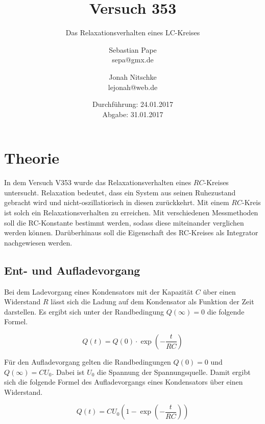 

\title{Versuch 353}
\subtitle{Das Relaxationsverhalten eines LC-Kreises}
\author{Sebastian Pape\\
        sepa@gmx.de \and
        Jonah Nitschke\\
        lejonah@web.de}
\date{Durchführung: 24.01.2017\\
      Abgabe: 31.01.2017}


\maketitle
\setcounter{page}{1}

\section{Theorie}

In dem Versuch V353 wurde das Relaxationsverhalten eines $RC$-Kreises untersucht.
Relaxation bedeutet, dass ein System aus seinen Ruhezustand gebracht wird
und nicht-oszillatiorisch in diesen zurückkehrt.
Mit einem $RC$-Kreis ist solch ein Relaxationsverhalten zu erreichen. Mit verschiedenen
Messmethoden soll die RC-Konstante bestimmt werden, sodass diese miteinander
verglichen werden können. Darüberhinaus soll die Eigenschaft des RC-Kreises als
Integrator nachgewiesen werden.

\subsection{Ent- und Aufladevorgang}

Bei dem Ladevorgang eines Kondensators mit der Kapazität $C$ über einen Widerstand
$R$ lässt sich die Ladung auf dem Kondensator als Funktion der Zeit darstellen.
Es ergibt sich unter der Randbedingung $Q(\infty) = 0$ die folgende Formel.

\begin{equation}
  \label{eqn:Entladen}
  Q(t) = Q(0)\cdot \exp{(-\frac{t}{RC})}
\end{equation}

Für den Aufladevorgang gelten die Randbedingungen $Q(0) = 0$ und $Q(\infty) = CU_0$. Dabei ist $U_0$ die Spannung der Spannungsquelle. Damit ergibt sich
die folgende Formel des Aufladevorgangs eines Kondensators über einen Widerstand.

\begin{equation}
  \label{eqn:aufladen}
  Q(t) = CU_0(1 - \exp{(-\frac{t}{RC})})
\end{equation}


